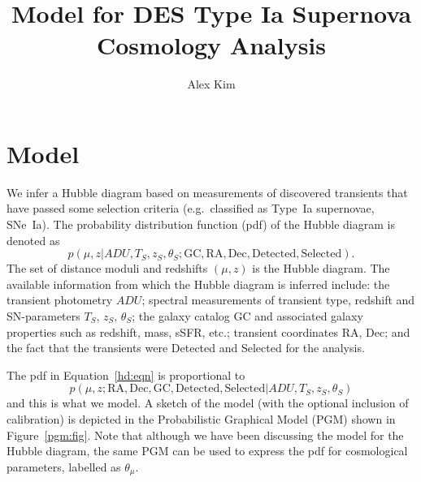 \documentclass[preprint]{aastex}
\begin{document}
\title{Model for DES Type Ia Supernova Cosmology Analysis}
\author{Alex Kim}

\section{Model}
We infer a Hubble diagram based on measurements of discovered transients
that have passed some selection criteria (e.g.\ classified as Type~Ia supernovae, SNe~Ia).  The probability distribution
function (pdf) of the Hubble diagram is denoted as
\begin{equation}
p({\mu},{z} |  {{ADU}}, {{T}}_S,{{z}}_S,
{{\theta}}_S; \text{GC},
{\text{RA}}, {\text{Dec}}, \text{Detected}, {\text{Selected}}).
\label{hd:eqn}
\end{equation}
The set of distance moduli
and redshifts $(\mu, z)$ is the Hubble diagram.  The available information
from which the Hubble diagram is inferred include:
the transient photometry ${ADU}$; spectral measurements of
transient
type, redshift and SN-parameters ${T}_S$, ${z}_S$, ${\theta}_S$;
the galaxy catalog ${\text{GC}}$ and associated galaxy properties such as redshift,
mass, sSFR, etc.; transient coordinates  $\text{RA}$, $\text{Dec}$;
and the fact that the transients were Detected and Selected for the analysis.

The pdf in Equation~\ref{hd:eqn} is proportional to
\begin{equation}
p({\mu},{z}; \text{RA}, \text{Dec}, \text{GC},  \text{Detected}, {\text{Selected}}
 |  {{ADU}}, {{T}}_S,{{z}}_S,
{{\theta}}_S)
\label{hd2:eqn}
\end{equation}
and this is what we model.  A sketch of the model (with the optional inclusion
of calibration) is depicted in the Probabilistic Graphical Model
(PGM)
shown in Figure~\ref{pgm:fig}.
Note that although we have been discussing the model for the Hubble diagram, the same PGM can
 be used to express the pdf for cosmological
parameters, labelled as $\theta_\mu$.
\end{document}
